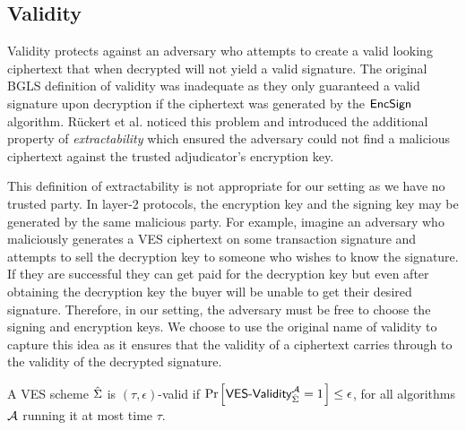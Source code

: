 \subsection{Validity}

Validity protects against an adversary who attempts to create a valid looking ciphertext that when decrypted will not yield a valid signature.
The original BGLS definition of validity was inadequate as they only guaranteed a valid signature upon decryption if the ciphertext was generated by the $\textsf{EncSign}$ algorithm.
Rückert et al. \cite{Ruckert:2009:SVE:1615384.1615387} noticed this problem and introduced the additional property of \emph{extractability} which ensured the adversary could not find a malicious ciphertext against the trusted adjudicator's encryption key.

This definition of extractability is not appropriate for our setting as we have no trusted party.
In layer-2 protocols, the encryption key and the signing key may be generated by the same malicious party.
For example, imagine an adversary who maliciously generates a VES ciphertext on some transaction signature and attempts to sell the decryption key to someone who wishes to know the signature.
If they are successful they can get paid for the decryption key but even after obtaining the decryption key the buyer will be unable to get their desired signature.
Therefore, in our setting, the adversary must be free to choose the signing and encryption keys.
We choose to use the original name of validity to capture this idea as it ensures that the validity of a ciphertext carries through to the validity of the decrypted signature.

\begin{definition}[Validity]
 A VES scheme $\hat{\Sigma}$ is $(\tau, \epsilon)$-valid if $\prob{\textsf{VES-Validity}^{\adv}_{\hatSigma} = 1} \leq \epsilon$, for all algorithms $\mathcal{A}$ running it at most time $\tau$.
\begin{center}
\end{center}
\end{definition}
\subsection{\EUFCMAVES}

